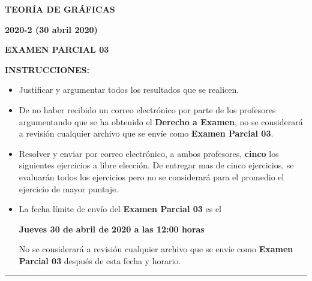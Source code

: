 \documentclass[12pt]{report}
\begin{document}
\begin{center}
\textbf{\LARGE {TEORÍA DE GRÁFICAS}}
\end{center}

\begin{center}
\textbf{{\large 2020-2 (30 abril 2020)}}
\end{center}

\begin{center}
\textbf{{\large EXAMEN PARCIAL 03}}
\end{center}

{\bf INSTRUCCIONES:}
\begin{itemize}
\item Justificar y argumentar todos los resultados que se realicen.

\item De no haber recibido un correo electrónico por parte de los profesores argumentando que se ha obtenido el \textbf{Derecho a Examen}, no se considerará a revisión cualquier archivo que se envíe como \textbf{Examen Parcial 03}.

\item Resolver y enviar por correo electrónico, a ambos profesores, \textbf{cinco} los siguientes ejercicios a libre elección. De entregar mas de cinco ejercicios, se evaluarán todos los ejercicios pero no se considerará para el promedio el ejercicio de mayor puntaje.

\item La fecha límite de envío del \textbf{Examen Parcial 03} es el
\begin{center}
\textbf{Jueves 30 de abril de 2020 a las 12:00 horas}
\end{center}
No se considerará a revisión cualquier archivo que se envíe como \textbf{Examen Parcial 03} después de esta fecha y horario.

\end{itemize}

\begin{center}
\rule[0mm]{20cm}{0.2mm}
\end{center}
\end{document}
